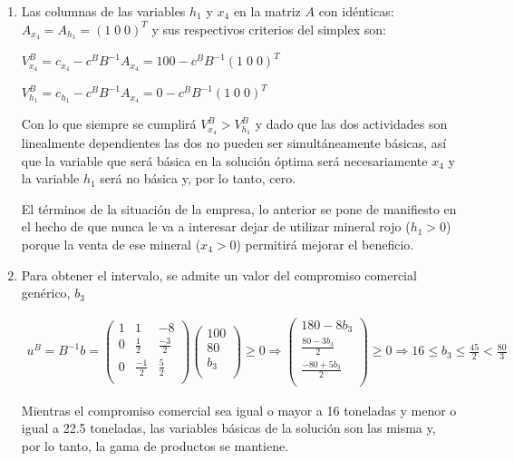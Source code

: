 \begin{enumerate}
\item Las columnas de las variables $h_1$ y $x_4$ en la matriz $A$ con idénticas: $A_{x_4} = A_{h_1} = (1\; 0\; 0)^T$ y sus respectivos criterios del simplex son:


$V^B_{x_4} = c_{x_4} - c^BB^{-1}A_{x_4} = 100 - c^BB^{-1}(1\; 0\; 0)^T$

$V^B_{h_1} = c_{h_1} - c^BB^{-1}A_{x_4} = 0 - c^BB^{-1}(1\; 0\; 0)^T$

Con lo que siempre se cumplirá $V^B_{x_4} > V^B_{h_1}$ y dado que las dos actividades son linealmente dependientes las dos no pueden ser simultáneamente básicas, así que la variable que será básica en la solución óptima será necesariamente $x_4$ y la variable $h_1$ será no básica y, por lo tanto, cero.

El términos de la situación de la empresa, lo anterior se pone de manifiesto en el hecho de que nunca le va a interesar dejar de utilizar mineral rojo ($h_1 > 0 $) porque la venta de ese mineral ($x_4 > 0$) permitirá mejorar el beneficio.

\item Para obtener el intervalo, se admite un valor del compromiso comercial genérico, $b_3$

\begin{equation}
\begin{split}
u^B = B^{-1}b = 
\begin{pmatrix}
1 & 1 & -8\\
0 & \frac{1}{2} & \frac{-3}{2}\\
0 & \frac{-1}{2} & \frac{5}{2}\\
\end{pmatrix}
\begin{pmatrix}
100\\
80\\
b_3\\
\end{pmatrix}
\geq 0 \Rightarrow
\begin{pmatrix}
180 - 8b_3\\
\frac{80-3b_3}{2}\\
\frac{-80+5b_3}{2}\\
\end{pmatrix}
\geq 0 \Rightarrow
16 \leq b_3 \leq \frac{45}{2} < \frac{80}{3}
\end{split}
\end{equation}

Mientras el compromiso comercial sea igual o mayor a 16 toneladas y menor o igual a 22.5 toneladas, las variables básicas de la solución son las misma y, por lo tanto, la gama de productos se mantiene.


\end{enumerate}
